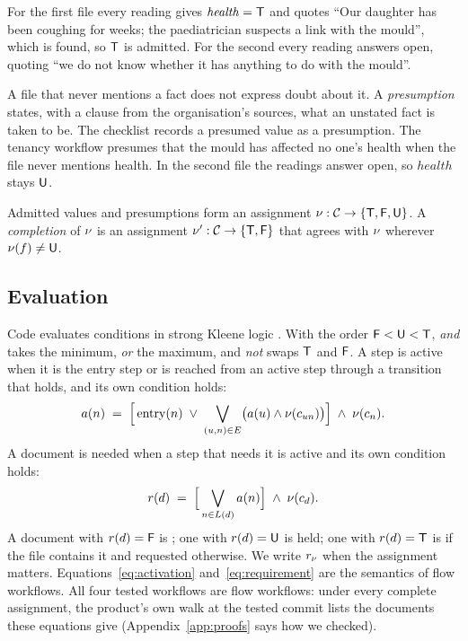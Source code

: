 For the first file every reading gives $\mathit{health}=\mathsf{T}$ and quotes ``Our daughter has been coughing for weeks; the paediatrician suspects a link with the mould'', which is found, so $\mathsf{T}$ is admitted. For the second every reading answers open, quoting ``we do not know whether it has anything to do with the mould''.

A file that never mentions a fact does not express doubt about it. A \emph{presumption} states, with a clause from the organisation's sources, what an unstated fact is taken to be. The checklist records a presumed value as a presumption. The tenancy workflow presumes that the mould has affected no one's health when the file never mentions health. In the second file the readings answer open, so $\mathit{health}$ stays $\mathsf{U}$.

Admitted values and presumptions form an assignment $\nu:\mathcal{C}\to\{\mathsf{T},\mathsf{F},\mathsf{U}\}$. A \emph{completion} of $\nu$ is an assignment $\nu':\mathcal{C}\to\{\mathsf{T},\mathsf{F}\}$ that agrees with $\nu$ wherever $\nu(f)\neq\mathsf{U}$.

\subsection{Evaluation}
\label{sec:kleene}

Code evaluates conditions in strong Kleene logic \cite{kleene1952introduction}. With the order $\mathsf{F}<\mathsf{U}<\mathsf{T}$, \emph{and} takes the minimum, \emph{or} the maximum, and \emph{not} swaps $\mathsf{T}$ and $\mathsf{F}$. A step is active when it is the entry step or is reached from an active step through a transition that holds, and its own condition holds:
\begin{equation}
a(n) \;=\; \Bigl[\,\mathrm{entry}(n)\;\vee\;\bigvee_{(u,n)\in E}\bigl(a(u)\wedge\nu(c_{un})\bigr)\Bigr]\;\wedge\;\nu(c_n).
\label{eq:activation}
\end{equation}
A document is needed when a step that needs it is active and its own condition holds:
\begin{equation}
r(d) \;=\; \Bigl[\,\bigvee_{n\in L(d)}a(n)\Bigr]\;\wedge\;\nu(c_d).
\label{eq:requirement}
\end{equation}
A document with $r(d)=\mathsf{F}$ is \skipd; one with $r(d)=\mathsf{U}$ is held; one with $r(d)=\mathsf{T}$ is \onfile if the file contains it and requested otherwise. We write $r_\nu$ when the assignment matters. Equations~\eqref{eq:activation} and~\eqref{eq:requirement} are the semantics of flow workflows. All four tested workflows are flow workflows: under every complete assignment, the product's own walk at the tested commit lists the documents these equations give (Appendix~\ref{app:proofs} says how we checked).


